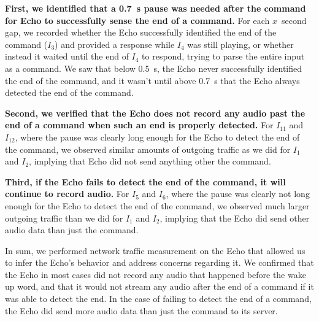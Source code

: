 \textbf{First, we identified that a 0.7~s pause was needed after the command for Echo to successfully sense the end of a command.} For each $x$~second gap, we recorded whether the Echo successfully identified the end of the command ($I_3$) and provided a response while $I_4$ was still playing, or whether instead it waited until the end of $I_4$ to respond, trying to parse the entire input as a command. We saw that below 0.5~s, the Echo never successfully identified the end of the command, and it wasn't until above 0.7~s that the Echo always detected the end of the command.

\textbf{Second, we verified that the Echo does not record any audio past the end of a command when such an end is properly detected.} For $I_{11}$ and $I_{12}$, where the pause was clearly long enough for the Echo to detect the end of the command, we observed similar amounts of outgoing traffic as we did for $I_{1}$ and $I_{2}$, implying that Echo did not send anything other the command.

\textbf{Third, if the Echo fails to detect the end of the command, it will continue to record audio.} For $I_{5}$ and $I_{6}$, where the pause was clearly not long enough for the Echo to detect the end of the command, we observed much larger outgoing traffic than we did for $I_{1}$ and $I_{2}$, implying that the Echo did send other audio data than just the command.

In sum, we performed network traffic measurement on the Echo that allowed us to infer the Echo's behavior and address concerns regarding it. We confirmed that the Echo in most cases did not record any audio that happened before the wake up word, and that it would not stream any audio after the end of a command if it was able to detect the end. In the case of failing to detect the end of a command, the Echo did send more audio data than just the command to its server.
